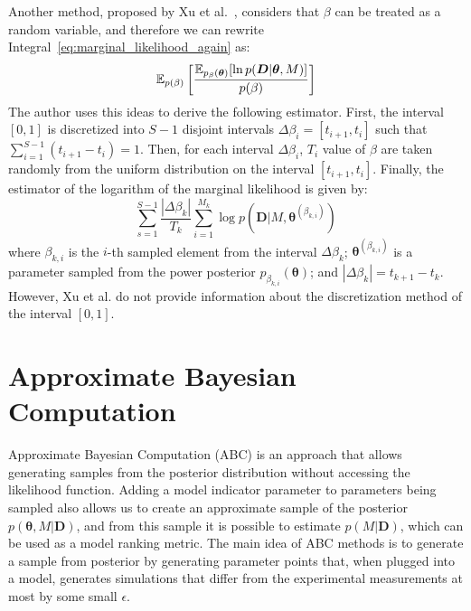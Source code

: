 Another method, proposed by Xu et al.~\cite{Xura20}, considers that $\beta$ can
be treated as a random variable, and therefore we can rewrite 
Integral~\ref{eq:marginal_likelihood_again} as:
\begin{equation}
    \mathbb{E}_{p (\beta)} 
        \left[\frac
            {\mathbb{E}_{p_\beta ({\bm \theta})}[\ln p({\bm D}|{\bm
            \theta}, M)]}
            {p (\beta)}
        \right]
\end{equation}
The author uses this ideas to derive the following estimator. First, 
the interval $[0, 1]$ is discretized into $S - 1$ disjoint intervals 
$\Delta\beta_i = [t_{i + 1}, t_i]$ such that  $\sum_{i = 1}^{S - 1} 
(t_{i + 1} - t_{i}) = 1$. Then, for each interval $\Delta\beta_i$, $T_i$ 
value of $\beta$ are taken randomly from the uniform distribution on the 
interval $[t_{i + 1}, t_i]$. Finally, the estimator of the logarithm of
the marginal likelihood is given by:
\begin{equation}
    \sum_{s = 1}^{S - 1}\frac{|\Delta\beta_k|}
                             {T_k}
        \sum_{i = 1}^{M_k} \log p ({\bm D} | M, {\bm \theta}^{(\beta_{k,
        i})})
\end{equation}
where $\beta_{k, i}$ is the $i$-th sampled element from the interval
$\Delta\beta_k$; ${\bm \theta}^{(\beta_{k, i})}$ is a parameter sampled 
from the power posterior $p_{\beta_{k, i}} ({\bm \theta})$; and 
$|\Delta\beta_k| = t_{k + 1} - t_k$. However, Xu et al. do not provide
information about the discretization method of the interval $[0, 1]$.


\section{Approximate Bayesian Computation}
\label{sec:abc_method}
Approximate Bayesian Computation (ABC) is an approach that allows 
generating samples from the posterior distribution without accessing the
likelihood function. Adding a model indicator parameter to parameters 
being sampled also allows us to create an approximate sample of the 
posterior $p ({\bm \theta}, M | {\bm D})$, and from this sample it is
possible to estimate $p (M | {\bm D})$, which can be used as a model
ranking metric. The main idea of ABC methods is to generate a sample
from posterior by generating parameter points that, when plugged into a
model, generates simulations that differ from the experimental 
measurements at most by some small $\epsilon$.

